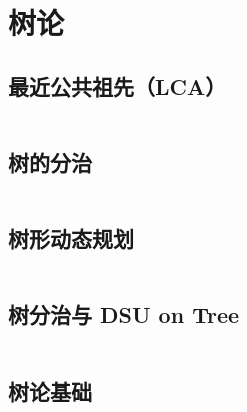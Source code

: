 \inputminted{cpp}{code/GraphTheory/NetworkFlow/MaxFlowAndMinCut.cpp}

\section{树论}

\subsection{最近公共祖先（LCA）}

\inputminted{cpp}{code/GraphTheory/Tree/LCA.cpp}

\subsection{树的分治}

\inputminted{cpp}{code/GraphTheory/Tree/TreeCutting.cpp}

\subsection{树形动态规划}

\inputminted{cpp}{code/GraphTheory/Tree/TreeDP.cpp}

\subsection{树分治与 DSU on Tree}

\inputminted{cpp}{code/GraphTheory/Tree/TreeDivideandConquerAndDSUonTree.cpp}

\subsection{树论基础}

\inputminted{cpp}{code/GraphTheory/Tree/TreeTheory.cpp}

